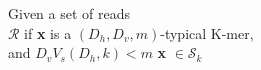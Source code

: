 \documentclass[preview]{standalone}
\begin{document}
\begin{center}
Given a set of reads\\ $\mathcal{R}$ if \textbf{x} is a $(D_h,D_v,m)$-typical K-mer, \\
            and $D_v V_s(D_h,k) < m$  \textbf{x} $\in \mathcal{S}_k $
\end{center}
\end{document}
